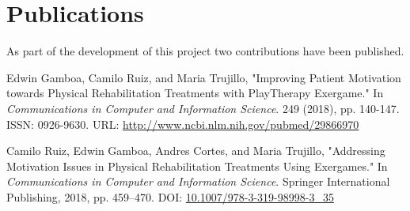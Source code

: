 

\chapter*{Publications} %

As part of the development of this project two contributions have been published.

\bigskip

Edwin Gamboa, Camilo Ruiz, and Maria Trujillo, "Improving Patient Motivation towards Physical Rehabilitation Treatments with PlayTherapy Exergame." In \textit{Communications in Computer and Information Science}. 249 (2018), pp. 140-147. ISSN: 0926-9630. URL: \url{http://www.ncbi.nlm.nih.gov/pubmed/29866970}

Camilo Ruiz, Edwin Gamboa, Andres Cortes, and Maria Trujillo, "Addressing Motivation Issues in Physical Rehabilitation Treatments Using Exergames." In \textit{Communications in Computer and Information Science}. Springer International Publishing, 2018, pp. 459--470. DOI: \href{https://doi.org/10.1007/978-3-319-98998-3_35}{10.1007/978-3-319-98998-3\_35}